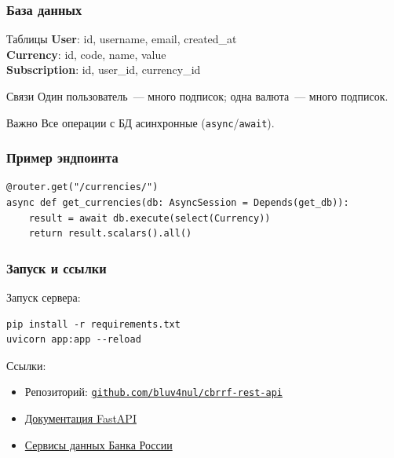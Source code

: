 \documentclass{beamer}
\begin{document}
\begin{frame}
  \frametitle{База данных}
  \begin{block}{Таблицы}
    \textbf{User}: id, username, email, created\_at\\
    \textbf{Currency}: id, code, name, value\\
    \textbf{Subscription}: id, user\_id, currency\_id
  \end{block}

  \begin{exampleblock}{Связи}
    Один пользователь~--- много подписок; одна валюта~--- много подписок.
  \end{exampleblock}

  \begin{alertblock}{Важно}
    Все операции с БД асинхронные (\texttt{async}/\texttt{await}).
  \end{alertblock}
\end{frame}

\begin{frame}[fragile]
  \frametitle{Пример эндпоинта}
\begin{lstlisting}
@router.get("/currencies/")
async def get_currencies(db: AsyncSession = Depends(get_db)):
    result = await db.execute(select(Currency))
    return result.scalars().all()
\end{lstlisting}
\end{frame}

\begin{frame}[fragile]
  \frametitle{Запуск и ссылки}
  Запуск сервера:
\begin{verbatim}
pip install -r requirements.txt
uvicorn app:app --reload
\end{verbatim}

  Ссылки:
  \begin{itemize}
    \item Репозиторий: \href{https://github.com/bluv4nul/cbrrf-rest-api}{\texttt{github.com/bluv4nul/cbrrf-rest-api}}
    \item \href{https://fastapi.tiangolo.com/}{Документация FastAPI}
    \item \href{https://www.cbr.ru/development/SXML/}{Сервисы данных Банка России}
  \end{itemize}
\end{frame}

\end{document}
